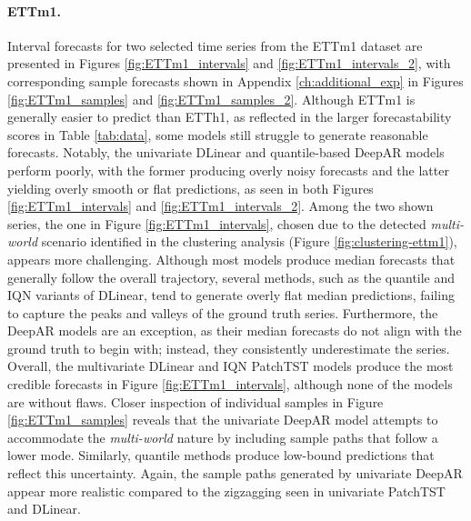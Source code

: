 \documentclass[a4paper,oneside,bibliography=totoc]{scrbook}
\begin{document}
\paragraph{ETTm1.}
Interval forecasts for two selected time series from the ETTm1 dataset are presented in Figures \ref{fig:ETTm1_intervals} and \ref{fig:ETTm1_intervals_2}, with corresponding sample forecasts shown in Appendix \ref{ch:additional_exp} in Figures \ref{fig:ETTm1_samples} and \ref{fig:ETTm1_samples_2}. 
Although ETTm1 is generally easier to predict than ETTh1, as reflected in the larger forecastability scores in Table \ref{tab:data}, some models still struggle to generate reasonable forecasts. 
Notably, the univariate DLinear and quantile-based DeepAR models perform poorly, with the former producing overly noisy forecasts and the latter yielding overly smooth or flat predictions, as seen in both Figures \ref{fig:ETTm1_intervals} and \ref{fig:ETTm1_intervals_2}.
Among the two shown series, the one in Figure \ref{fig:ETTm1_intervals}, chosen due to the detected \textit{multi-world} scenario identified in the clustering analysis (Figure \ref{fig:clustering-ettm1}), appears more challenging. 
Although most models produce median forecasts that generally follow the overall trajectory, several methods, such as the quantile and IQN variants of DLinear, tend to generate overly flat median predictions, failing to capture the peaks and valleys of the ground truth series.
Furthermore, the DeepAR models are an exception, as their median forecasts do not align with the ground truth to begin with; instead, they consistently underestimate the series.
Overall, the multivariate DLinear and IQN PatchTST models produce the most credible forecasts in Figure \ref{fig:ETTm1_intervals}, although none of the models are without flaws.
Closer inspection of individual samples in Figure \ref{fig:ETTm1_samples} reveals that the univariate DeepAR model attempts to accommodate the \textit{multi-world} nature by including sample paths that follow a lower mode. Similarly, quantile methods produce low-bound predictions that reflect this uncertainty. 
Again, the sample paths generated by univariate DeepAR appear more realistic compared to the zigzagging seen in univariate PatchTST and DLinear. 
\end{document}
